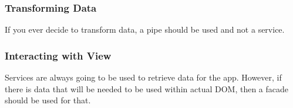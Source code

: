 \subsubsection{ Transforming Data }
If you ever decide to transform data, a pipe should be used and not a service.
\subsubsection{ Interacting with View }
Services are always going to be used to retrieve data for the app. However,
if there is data that will be needed to be used within actual DOM, then a
facade should be used for that.  

